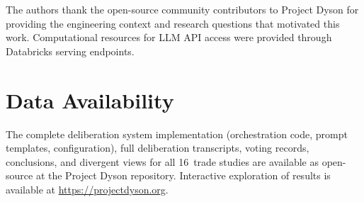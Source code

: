 \documentclass[11pt,a4paper]{article}
\begin{document}
The authors thank the open-source community contributors to Project Dyson for providing the engineering context and research questions that motivated this work. Computational resources for LLM API access were provided through Databricks serving endpoints.

\section*{Data Availability}

The complete deliberation system implementation (orchestration code, prompt templates, configuration), full deliberation transcripts, voting records, conclusions, and divergent views for all 16~trade studies are available as open-source at the Project Dyson repository. Interactive exploration of results is available at \url{https://projectdyson.org}.
\end{document}
